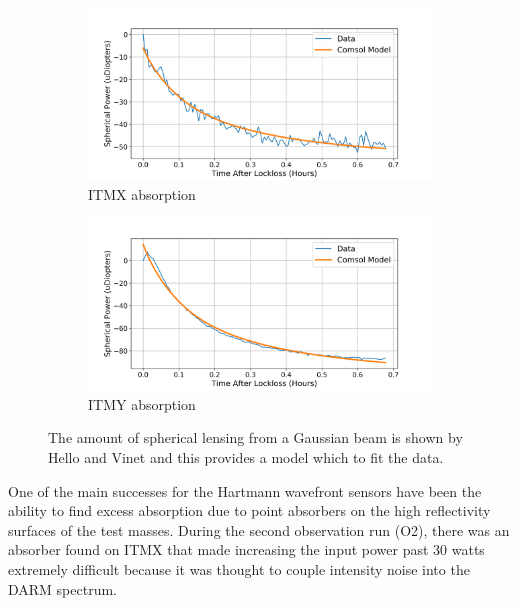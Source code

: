 	\begin{figure}[ht]
	\centering
	\begin{subfigure}[a]{0.7\textwidth}
		\centering
		\includegraphics[width=\textwidth]{../Figures/itmx_HWS_Absorption.png}
		\caption{ITMX absorption}
		\label{fig:itmx_abs}
	\end{subfigure}
	\hfill
	\begin{subfigure}[b]{0.7\textwidth}
		\centering
		\includegraphics[width=\textwidth]{../Figures/itmy_HWS_Absorption.png}
		\caption{ITMY absorption}
		\label{fig:itmy_abs}
	\end{subfigure}
	\caption{The amount of spherical lensing from a Gaussian beam is shown by Hello and Vinet \cite{Vinet_Thermal_Issues} and this provides a model which to fit the data.}
	\label{fig:hws_abs}
	\end{figure}
	
	One of the main successes for the Hartmann wavefront sensors have been the ability to find excess absorption due to point absorbers on the high reflectivity surfaces of the test masses.  During the second observation run (O2), there was an absorber found on ITMX that made increasing the input power past 30 watts extremely difficult because it was thought to couple intensity noise into the DARM spectrum.
	
